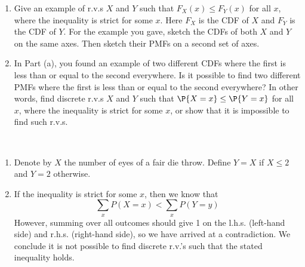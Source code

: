 
\setcounter{theorem}{6}

\begin{exercise} [BH.3.12]
	\begin{enumerate}
		\item Give an example of r.v.s $X$ and $Y$ such that $F_X(x) \leq F_Y(x)$ for all $x$, where the inequality is strict for some $x$. Here $F_X$ is the CDF of $X$ and $F_Y$ is the CDF of $Y$. For the example you gave, sketch the CDFs of both $X$ and $Y$ on the same axes. Then sketch their PMFs on a second set of axes.
		\item In Part (a), you found an example of two different CDFs where the first is less than or equal to the second everywhere. Is it possible to find two different PMFs where the first is less than or equal to the second everywhere? In other words, find discrete r.v.s $X$ and $Y$ such that $\P{X = x} \leq \P{Y = x}$ for all $x$, where the inequality is strict for some $x$, or show that it is impossible to find such r.v.s.
	\end{enumerate}
\begin{solution}~
	\begin{enumerate}
		\item Denote by $X$ the number of eyes of a fair die throw. Define $Y=X$ if $X\leq 2$ and $Y=2$ otherwise. 
		\item If the inequality is strict for some $x$, then we know that
		\begin{equation}
			\sum_{x}P(X=x)<\sum_{x}P(Y=y)
		\end{equation}
		However, summing over all outcomes should give 1 on the l.h.s. (left-hand side) and r.h.s. (right-hand side), so we have arrived at a contradiction. We conclude it is not possible to find discrete r.v.'s such that the stated inequality holds.
	\end{enumerate}
\end{solution}
\end{exercise}

